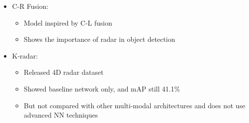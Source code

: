 \documentclass[rnd]{mas_proposal}
\begin{document}
\begin{itemize}
    \item C-R Fusion:
    \cite{Nobis2020May}
    \begin{itemize}
        \item Model inspired by C-L fusion
        \item Shows the importance of radar in object detection
    \end{itemize}
    
    \item K-radar: 
    \cite{Paek2022Jun}
    \begin{itemize}
        \item Released 4D radar dataset
        \item Showed baseline network only, and mAP still 41.1\%
        \item But not compared with other multi-modal architectures and does not use advanced NN techniques 
    \end{itemize}
        
    

\end{itemize}
\end{document}
